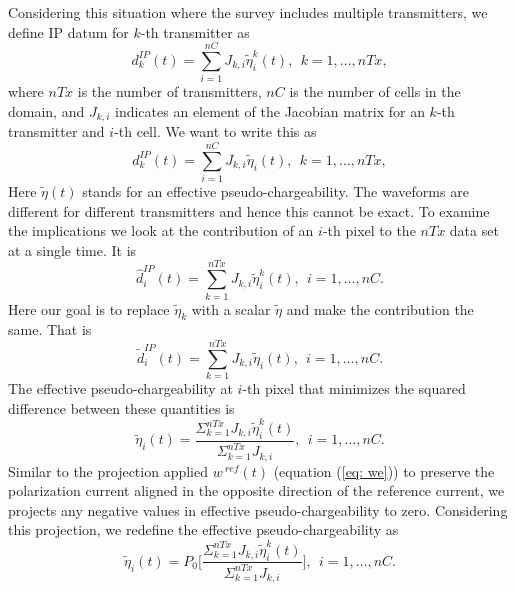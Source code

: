 \documentclass[a4paper, 11pt]{article}
\newcommand{\peta}{\tilde{\eta}}
\newcommand{\dip}{d^{IP}}
\begin{document}
Considering this situation where the survey includes multiple transmitters, we define IP datum for $k$-th transmitter as 
\begin{equation}
  \dip_k(t) = \sum_{i=1}^{nC}J_{k,i}\peta^k_i (t), \ \ k=1, \ldots, nTx,
  \label{eq: dip_kthTx}
\end{equation}
where $nTx$ is the number of transmitters, $nC$ is the number of cells in the domain, and $J_{k,i}$ indicates an element of the Jacobian matrix for an $k$-th transmitter and $i$-th cell. We want to write this as 
\begin{equation}
  \dip_k(t) = \sum_{i=1}^{nC}J_{k,i}\peta_i (t), \ \ k=1, \ldots, nTx,
  \label{eq: dipeff_kthTx}
\end{equation}
Here $\peta(t)$ stands for an effective pseudo-chargeability.
The waveforms are different for different transmitters and hence this cannot be exact. To examine the implications we look at the contribution of an $i$-th pixel to the $nTx$ data set at a single time. 
It is 
\begin{equation}
  \hat{d}^{IP}_i(t) =\sum_{k=1}^{nTx} J_{k,i} \peta^k_i(t), \ \ i=1, \ldots, nC.
  \label{eq: dip_hat}
\end{equation}
Here our goal is to replace $\peta_k$ with a scalar $\peta$ and make the contribution the same. That is 
\begin{equation}
  \tilde{d}^{IP}_i(t) =\sum_{k=1}^{nTx} J_{k,i} \peta_i(t), \ \ i=1, \ldots, nC.
  \label{eq: dip_tilde}
\end{equation}
The effective pseudo-chargeability at $i$-th pixel that minimizes the squared difference between these quantities is 
\begin{equation}
  \peta_i(t) = \frac {\Sigma_{k=1}^{nTx} J_{k,i}\peta^k_i(t)} {\Sigma_{k=1}^{nTx} J_{k,i}}, \ \ i=1, \ldots, nC.
  \label{eq: petaeff}
\end{equation}
Similar to the projection applied $w^{\ ref}(t)$ (equation (\ref{eq: we})) to preserve the polarization current aligned in the opposite direction of the reference current, we projects any negative values in effective pseudo-chargeability to zero. 
Considering this projection, we redefine the effective pseudo-chargeability as 
\begin{equation}
  \peta_i(t) = P_0\Big[\frac {\Sigma_{k=1}^{nTx} J_{k,i}\peta^k_i(t)} {\Sigma_{k=1}^{nTx} J_{k,i}}\Big], \ \ i=1, \ldots, nC.
  \label{eq: petaeff_pos}
\end{equation}
\end{document}
